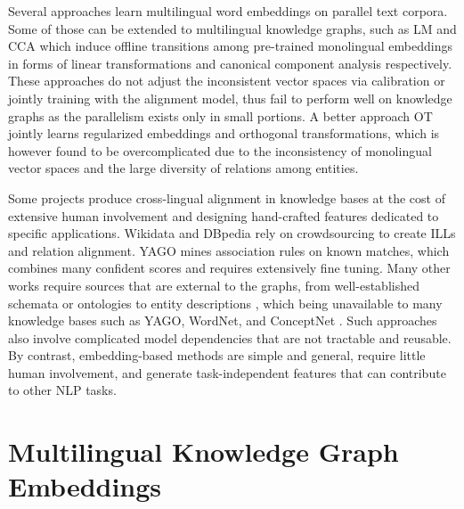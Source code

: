 \documentclass{article}
\def\inv{\vspace{-0.1cm}}
\begin{document}
Several approaches learn multilingual word embeddings
on parallel text corpora. Some of those can be extended to multilingual knowledge graphs, such as LM \cite{mikolov2013exploiting} and CCA \cite{faruqui2014improving} which induce offline transitions among pre-trained monolingual embeddings in forms of linear transformations and canonical component analysis respectively.
These approaches do not adjust the inconsistent vector spaces via calibration or jointly training with the \mbox{alignment} model, thus fail to perform well on knowledge graphs as
the parallelism exists only in small portions.
A better approach OT~\cite{xing2015normalized} jointly learns regularized embeddings and orthogonal transformations, which is however found to be overcomplicated due to the inconsistency of monolingual vector spaces and the large diversity of relations among entities.




 Some projects produce cross-lingual alignment in knowledge bases
at the cost of extensive human involvement and designing
hand-crafted features dedicated to specific applications.
Wikidata \cite{vrandevcic2012wikidata} and
DBpedia \cite{lehmann2015dbpedia} rely on crowdsourcing to create ILLs and relation alignment. YAGO \cite{mahdisoltani2014yago3} mines association rules on known matches, which combines many confident scores and requires extensively fine tuning.
Many other works require sources that are external to the graphs, from well-established schemata or ontologies \cite{nguyen2011multi,suchanek2011paris,rinser2013cross} to entity descriptions \cite{yang2015entity}, which being unavailable to many knowledge bases such as YAGO, WordNet, and ConceptNet \cite{speer2013conceptnet}.
Such approaches also involve complicated model dependencies that are not tractable and reusable.
By contrast, embedding-based methods
are simple and general, require little human involvement,
and generate task-independent features that can contribute to other NLP tasks.
\par

\def\kb{\mathit{KB}}
\def\language{\mathcal{L}}
\def\bhline{\specialrule{.2em}{0em}{0em}}
\newcommand{\bigO}[1]{{\rm O} (#1)\xspace}

\inv
\section{Multilingual Knowledge Graph Embeddings}
\end{document}
